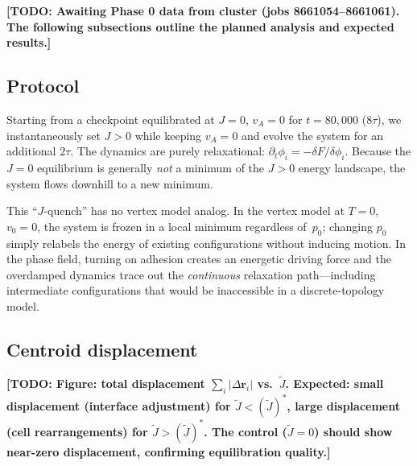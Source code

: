 \documentclass[aps,pre,twocolumn,superscriptaddress,longbibliography]{revtex4-2}
\newcommand{\vA}{v_{\!A}}                  %
\newcommand{\Jk}{\tilde{J}}                %
\newcommand{\phii}{\phi_i}                 %
\newcommand{\todo}[1]{{\color{red}\textbf{[TODO: #1]}}}
\begin{document}

\todo{Awaiting Phase 0 data from cluster (jobs 8661054--8661061).  The
following subsections outline the planned analysis and expected results.}

\subsection{Protocol}
\label{sec:quench:protocol}

Starting from a checkpoint equilibrated at $J = 0$, $\vA = 0$ for
$t = 80{,}000$ ($8\tau$), we instantaneously set $J > 0$ while keeping
$\vA = 0$ and evolve the system for an additional $2\tau$.  The dynamics are
purely relaxational: $\partial_t \phii = -\delta F/\delta\phii$.  Because
the $J = 0$ equilibrium is generally \emph{not} a minimum of the
$J > 0$ energy landscape, the system flows downhill to a new minimum.

This ``$J$-quench'' has no vertex model analog.  In the vertex model at
$T = 0$, $v_0 = 0$, the system is frozen in a local minimum regardless
of~$p_0$; changing $p_0$ simply relabels the energy of existing configurations
without inducing motion.  In the phase field, turning on adhesion creates an
energetic driving force and the overdamped dynamics trace out the
\emph{continuous} relaxation path---including intermediate configurations
that would be inaccessible in a discrete-topology model.

\subsection{Centroid displacement}
\label{sec:quench:displacement}

\todo{Figure: total displacement $\sum_i |\Delta\bm{r}_i|$ vs.\ $\Jk$.
Expected: small displacement (interface adjustment) for $\Jk < (\Jk)^*$,
large displacement (cell rearrangements) for $\Jk > (\Jk)^*$.  The control
($\Jk = 0$) should show near-zero displacement, confirming equilibration
quality.}
\end{document}
